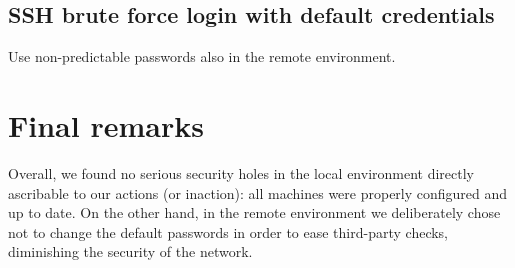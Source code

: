 \documentclass{homework}
\begin{document}
    \subsection{SSH brute force login with default credentials}
    Use non-predictable passwords also in the remote environment.
    
    
    \section{Final remarks}
    Overall, we found no serious security holes in the local environment directly ascribable to our actions (or inaction): all machines were properly configured and up to date.
    On the other hand, in the remote environment we deliberately chose not to change the default passwords in order to ease third-party checks, diminishing the security of the network.
\end{document}
